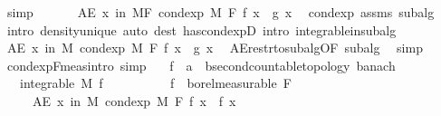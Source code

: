 \begin{isabellebody}
\ simp\isanewline
\ \ \isacommand{{\isacharbraceright}{\kern0pt}}\isamarkupfalse%
\isanewline
\ \ \isamarkupfalse%
\ {\isachardoublequoteopen}AE\ x\ in\ {\isacharquery}{\kern0pt}MF{\isachardot}{\kern0pt}\ cond{\isacharunderscore}{\kern0pt}exp\ M\ F\ f\ x\ {\isacharequal}{\kern0pt}\ g\ x{\isachardoublequoteclose}\ \isamarkupfalse%
\ cond{\isacharunderscore}{\kern0pt}exp\ assms\ subalg\ \isamarkupfalse%
\ {\isacharparenleft}{\kern0pt}intro\ density{\isacharunderscore}{\kern0pt}unique{\isacharcomma}{\kern0pt}\ auto\ dest{\isacharcolon}{\kern0pt}\ has{\isacharunderscore}{\kern0pt}cond{\isacharunderscore}{\kern0pt}expD\ intro{\isacharbang}{\kern0pt}{\isacharcolon}{\kern0pt}\ integrable{\isacharunderscore}{\kern0pt}in{\isacharunderscore}{\kern0pt}subalg{\isacharparenright}{\kern0pt}\isanewline
\ \ \isamarkupfalse%
\ \isamarkupfalse%
\ {\isachardoublequoteopen}AE\ x\ in\ M{\isachardot}{\kern0pt}\ cond{\isacharunderscore}{\kern0pt}exp\ M\ F\ f\ x\ {\isacharequal}{\kern0pt}\ g\ x{\isachardoublequoteclose}\ \isamarkupfalse%
\ AE{\isacharunderscore}{\kern0pt}restr{\isacharunderscore}{\kern0pt}to{\isacharunderscore}{\kern0pt}subalg{\isacharbrackleft}{\kern0pt}OF\ subalg{\isacharbrackright}{\kern0pt}\ \isamarkupfalse%
\ simp\isanewline
{}\isamarkupfalse%
%
\endisatagproof
{\isafoldproof}%
%
\isadelimproof
\isanewline
%
\endisadelimproof
\isanewline
{}\isamarkupfalse%
\ cond{\isacharunderscore}{\kern0pt}exp{\isacharunderscore}{\kern0pt}F{\isacharunderscore}{\kern0pt}meas{\isacharbrackleft}{\kern0pt}intro{\isacharcomma}{\kern0pt}\ simp{\isacharbrackright}{\kern0pt}{\isacharcolon}{\kern0pt}\isanewline
\ \ \ f\ {\isacharcolon}{\kern0pt}{\isacharcolon}{\kern0pt}\ {\isachardoublequoteopen}{\isacharprime}{\kern0pt}a\ {\isasymRightarrow}\ {\isacharprime}{\kern0pt}b{\isacharcolon}{\kern0pt}{\isacharcolon}{\kern0pt}{\isacharbraceleft}{\kern0pt}second{\isacharunderscore}{\kern0pt}countable{\isacharunderscore}{\kern0pt}topology{\isacharcomma}{\kern0pt}\ banach{\isacharbraceright}{\kern0pt}{\isachardoublequoteclose}\isanewline
\ \ \ {\isachardoublequoteopen}integrable\ M\ f{\isachardoublequoteclose}\isanewline
\ \ \ \ \ \ \ \ \ \ {\isachardoublequoteopen}f\ {\isasymin}\ borel{\isacharunderscore}{\kern0pt}measurable\ F{\isachardoublequoteclose}\isanewline
\ \ \ \ \ {\isachardoublequoteopen}AE\ x\ in\ M{\isachardot}{\kern0pt}\ cond{\isacharunderscore}{\kern0pt}exp\ M\ F\ f\ x\ {\isacharequal}{\kern0pt}\ f\ x{\isachardoublequoteclose}\isanewline

\end{isabellebody}
